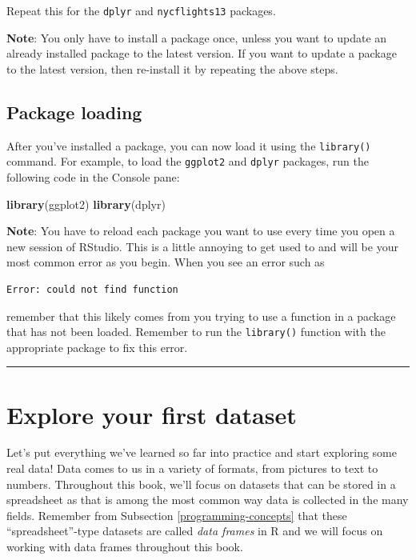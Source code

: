 \documentclass[12pt,]{krantz}
\makeatletter
\newenvironment{Shaded}{\begin{snugshade}}{\end{snugshade}}
\newcommand{\KeywordTok}[1]{\textcolor[rgb]{0.27,0.27,0.27}{\textbf{#1}}}
\newcommand{\NormalTok}[1]{#1}
\newenvironment{kframe}{%
\medskip{}
\setlength{\fboxsep}{.8em}
 \def\at@end@of@kframe{}%
 \ifinner\ifhmode%
  \def\at@end@of@kframe{\end{minipage}}%
  \begin{minipage}{\columnwidth}%
 \fi\fi%
 \def\FrameCommand##1{\hskip\@totalleftmargin \hskip-\fboxsep
 \colorbox{shadecolor}{##1}\hskip-\fboxsep
     \hskip-\linewidth \hskip-\@totalleftmargin \hskip\columnwidth}%
 \MakeFramed {\advance\hsize-\width
   \@totalleftmargin\z@ \linewidth\hsize
   \@setminipage}}%
 {\par\unskip\endMakeFramed%
 \at@end@of@kframe}
\renewenvironment{Shaded}{\begin{kframe}}{\end{kframe}}
\makeatother
\begin{document}
Repeat this for the \texttt{dplyr} and \texttt{nycflights13} packages.

\textbf{Note}: You only have to install a package once, unless you want
to update an already installed package to the latest version. If you
want to update a package to the latest version, then re-install it by
repeating the above steps.

\subsection{Package loading}\label{package-loading}

After you've installed a package, you can now load it using the
\texttt{library()} command. For example, to load the \texttt{ggplot2}
and \texttt{dplyr} packages, run the following code in the Console pane:

\begin{Shaded}
\begin{Highlighting}[]
\KeywordTok{library}\NormalTok{(ggplot2)}
\KeywordTok{library}\NormalTok{(dplyr)}
\end{Highlighting}
\end{Shaded}

\textbf{Note}: You have to reload each package you want to use every
time you open a new session of RStudio. This is a little annoying to get
used to and will be your most common error as you begin. When you see an
error such as

\begin{verbatim}
Error: could not find function
\end{verbatim}

remember that this likely comes from you trying to use a function in a
package that has not been loaded. Remember to run the \texttt{library()}
function with the appropriate package to fix this error.

\begin{center}\rule{0.5\linewidth}{\linethickness}\end{center}

\section{Explore your first dataset}\label{nycflights13}

Let's put everything we've learned so far into practice and start
exploring some real data! Data comes to us in a variety of formats, from
pictures to text to numbers. Throughout this book, we'll focus on
datasets that can be stored in a spreadsheet as that is among the most
common way data is collected in the many fields. Remember from
Subsection \ref{programming-concepts} that these ``spreadsheet''-type
datasets are called \emph{data frames} in R and we will focus on working
with data frames throughout this book.
\end{document}

